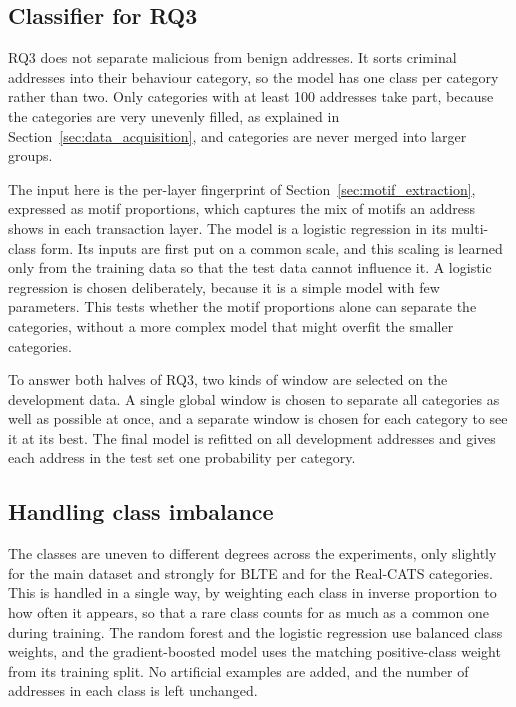 \documentclass{thesisclass}
\begin{document}
\subsection{Classifier for RQ3}

RQ3 does not separate malicious from benign addresses. It sorts criminal
addresses into their behaviour category, so the model has one class per category
rather than two. Only categories with at least 100 addresses take part, because the categories are
very unevenly filled, as explained in Section~\ref{sec:data_acquisition}, and
categories are never merged into larger groups.

The input here is the per-layer fingerprint of
Section~\ref{sec:motif_extraction}, expressed as motif proportions, which captures
the mix of motifs an address shows in each transaction layer. The model is a
logistic regression in its multi-class form. Its inputs are first put on a common
scale, and this scaling is learned only from the training data so that the test
data cannot influence it. A logistic regression is chosen deliberately, because it
is a simple model with few parameters. This tests whether the motif proportions
alone can separate the categories, without a more complex model that might overfit
the smaller categories.

To answer both halves of RQ3, two kinds of window are selected on the development
data. A single global window is chosen to separate all categories as well as
possible at once, and a separate window is chosen for each category to see it at
its best. The final model is refitted on all development addresses and gives each address in
the test set one probability per category.

\subsection{Handling class imbalance}

The classes are uneven to different degrees across the experiments, only slightly
for the main dataset and strongly for BLTE and for the Real-CATS categories. This
is handled in a single way, by weighting each class in inverse proportion to how
often it appears, so that a rare class counts for as much as a common one during
training. The random forest and the logistic regression use balanced class
weights, and the gradient-boosted model uses the matching positive-class weight
from its training split. No artificial examples are added, and the number of
addresses in each class is left unchanged.
\end{document}
